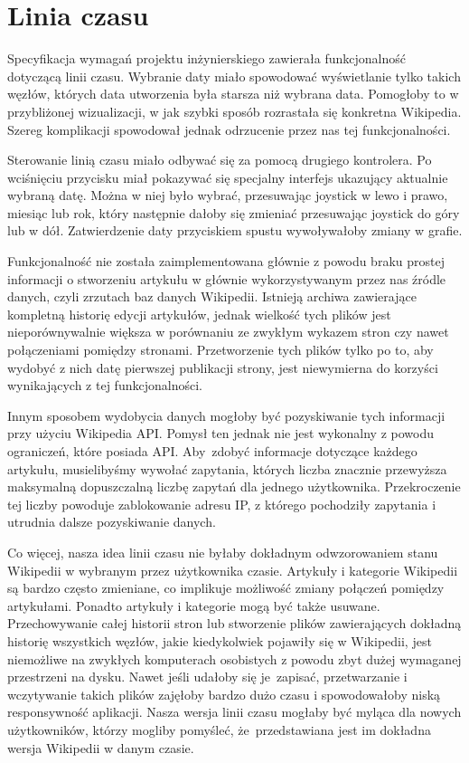 \section{Linia czasu}
\label{sec:linia-czasu}
Specyfikacja wymagań projektu inżynierskiego zawierała funkcjonalność dotyczącą linii czasu. Wybranie daty miało spowodować wyświetlanie tylko takich węzłów, których data utworzenia była starsza niż wybrana data. Pomogłoby to w przybliżonej wizualizacji, w jak szybki sposób rozrastała się konkretna Wikipedia. Szereg komplikacji spowodował jednak odrzucenie przez nas tej funkcjonalności.

Sterowanie linią czasu miało odbywać się za pomocą drugiego kontrolera. Po wciśnięciu przycisku miał pokazywać się specjalny interfejs ukazujący aktualnie wybraną datę. Można w niej było wybrać, przesuwając joystick w lewo i prawo, miesiąc lub rok, który następnie dałoby się zmieniać przesuwając joystick do góry lub w dół. Zatwierdzenie daty przyciskiem spustu wywoływałoby zmiany w grafie. 

Funkcjonalność nie została zaimplementowana głównie z powodu braku prostej informacji o stworzeniu artykułu w głównie wykorzystywanym przez nas źródle danych, czyli zrzutach baz danych Wikipedii. Istnieją archiwa zawierające kompletną historię edycji artykułów, jednak wielkość tych plików jest nieporównywalnie większa w porównaniu ze zwykłym wykazem stron czy nawet połączeniami pomiędzy stronami. Przetworzenie tych plików tylko po to, aby wydobyć z nich datę pierwszej publikacji strony, jest niewymierna do korzyści wynikających z tej funkcjonalności. 

Innym sposobem wydobycia danych mogłoby być pozyskiwanie tych informacji przy użyciu Wikipedia API. Pomysł ten jednak nie jest wykonalny z powodu ograniczeń, które posiada API. Aby~zdobyć informacje dotyczące każdego artykułu, musielibyśmy wywołać zapytania, których liczba znacznie przewyższa maksymalną dopuszczalną liczbę zapytań dla jednego użytkownika. Przekroczenie tej liczby powoduje zablokowanie adresu IP, z którego pochodziły zapytania i utrudnia dalsze pozyskiwanie danych.

Co więcej, nasza idea linii czasu nie byłaby dokładnym odwzorowaniem stanu Wikipedii w wybranym przez użytkownika czasie. Artykuły i kategorie Wikipedii są bardzo często zmieniane, co implikuje możliwość zmiany połączeń pomiędzy artykułami. Ponadto artykuły i kategorie mogą być także usuwane. Przechowywanie całej historii stron lub stworzenie plików zawierających dokładną historię wszystkich węzłów, jakie kiedykolwiek pojawiły się w Wikipedii, jest niemożliwe na zwykłych komputerach osobistych z powodu zbyt dużej wymaganej przestrzeni na dysku. Nawet jeśli udałoby się je~zapisać, przetwarzanie i wczytywanie takich plików zajęłoby bardzo dużo czasu i spowodowałoby niską responsywność aplikacji. Nasza wersja linii czasu mogłaby być myląca dla nowych użytkowników, którzy mogliby pomyśleć, że~przedstawiana jest im dokładna wersja Wikipedii w danym czasie.
\newpage